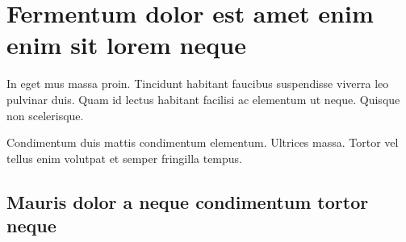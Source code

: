 \documentclass[
]{HyperedReport}
\begin{document}

\newpage

\section*{Fermentum dolor est amet enim enim sit lorem neque}

In eget mus massa proin. Tincidunt habitant faucibus suspendisse viverra leo pulvinar duis. Quam id lectus habitant facilisi ac elementum ut neque. Quisque non scelerisque.

Condimentum duis mattis condimentum elementum. Ultrices massa. Tortor vel tellus enim volutpat et semper fringilla tempus.

\subsection*{Mauris dolor a neque condimentum tortor neque}
\end{document}
